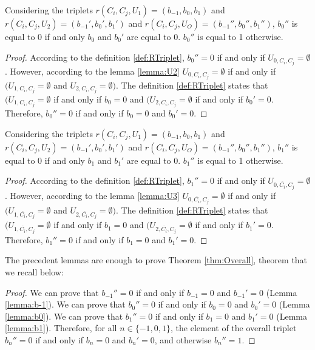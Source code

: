 \begin{lemma}\label{lemma:b0}
Considering the triplets $r(C_{i},C_{j},U_{1}) = (b_{-1}, b_{0}, b_{1})$ and $r(C_{i},C_{j},U_{2}) = (b_{-1}', b_{0}', b_{1}')$ and $r(C_{i}, C_{j}, U_{O}) = (b_{-1}'', b_{0}'', b_{1}'')$, $b_{0}''$ is equal to 0 if and only $b_{0}$ and $b_{0}'$ are equal to 0. $b_{0}''$ is equal to 1 otherwise.
\end{lemma}

\begin{proof}
According to the definition \ref{def:RTriplet}, $b_{0}'' = 0$ if and only if $U_{0,C_i,C_{j}} = \emptyset$. However, according to the lemma \ref{lemma:U2} $U_{0,C_i,C_{j}} = \emptyset$ if and only if $(U_{1,C_i,C_{j}} = \emptyset$ and $U_{2,C_i,C_{j}} = \emptyset)$. The definition \ref{def:RTriplet} states that $(U_{1,C_i,C_{j}} = \emptyset$ if and only if $b_{0} = 0$ and $(U_{2,C_i,C_{j}} = \emptyset$ if and only if $b_{0}' = 0$. Therefore, $b_{0}'' = 0$ if and only if $b_{0} = 0$ and $b_{0}' = 0$.
\end{proof}

\begin{lemma}\label{lemma:b1}
Considering the triplets $r(C_{i},C_{j},U_{1}) = (b_{-1}, b_{0}, b_{1})$ and $r(C_{i},C_{j},U_{2}) = (b_{-1}', b_{0}', b_{1}')$ and $r(C_{i}, C_{j}, U_{O}) = (b_{-1}'', b_{0}'', b_{1}'')$, $b_{1}''$ is equal to 0 if and only $b_{1}$ and $b_{1}'$ are equal to 0. $b_{1}''$ is equal to 1 otherwise.
\end{lemma}

\begin{proof}
According to the definition \ref{def:RTriplet}, $b_{1}'' = 0$ if and only if $U_{0,\overbar{C_i},C_j} = \emptyset$. However, according to the lemma \ref{lemma:U3} $U_{0,\overbar{C_i},C_{j}} = \emptyset$ if and only if $(U_{1,\overbar{C_i},C_{j}} = \emptyset$ and $U_{2,\overbar{C_i},C_{j}} = \emptyset)$. The definition \ref{def:RTriplet} states that $(U_{1,\overbar{C_i},C_{j}} = \emptyset$ if and only if $b_{1} = 0$ and $(U_{2,\overbar{C_i},C_{j}} = \emptyset$ if and only if $b_{1}' = 0$. Therefore, $b_{1}'' = 0$ if and only if $b_{1} = 0$ and $b_{1}' = 0$.
\end{proof}

The precedent lemmas are enough to prove Theorem \ref{thm:Overall}, theorem that we recall below:

\Overall*

\begin{proof}
We can prove that $b_{-1}'' = 0$ if and only if $b_{-1} = 0$ and $b_{-1}' = 0$ (Lemma \ref{lemma:b-1}).
We can prove that $b_{0}'' = 0$ if and only if $b_{0} = 0$ and $b_{0}' = 0$ (Lemma \ref{lemma:b0}).
We can prove that $b_{1}'' = 0$ if and only if $b_{1} = 0$ and $b_{1}' = 0$ (Lemma \ref{lemma:b1}).
Therefore, for all $n \in \{-1, 0, 1\}$, the element of the overall triplet $b_{n}''=0$  if and only if $b_{n} = 0$ and $b_{n}' = 0$, and otherwise $b_{n}''=1$.
\end{proof}